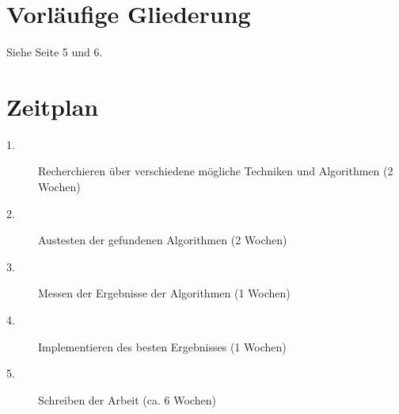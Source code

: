 \begin{onehalfspace}
\section{Vorläufige Gliederung}
Siehe Seite 5 und 6.

\section{Zeitplan}

\begin{description}
	\item[1.]
	Recherchieren über verschiedene mögliche Techniken und Algorithmen (2 Wochen)
	\item[2.] 
	Austesten der gefundenen Algorithmen (2 Wochen)
	\item[3.]
	Messen der Ergebnisse der Algorithmen (1 Wochen)
	\item[4.] Implementieren des besten Ergebnisses (1 Wochen)
	\item[5.] Schreiben der Arbeit (ca. 6 Wochen)
\end{description}


\end{onehalfspace}